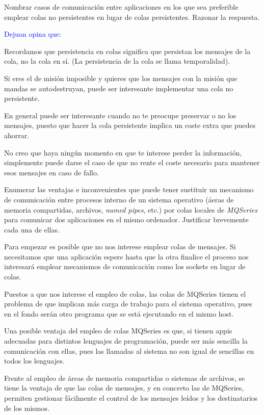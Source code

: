   \begin{problem}[8]
  Nombrar casos de comunicación entre aplicaciones en los que sea
preferible emplear colas no persistentes en lugar de colas persistentes.
Razonar la respuesta.
  \solution

\textcolor{blue}{Dejuan opina que:}

Recordamos que persistencia en colas significa que persistan los mensajes de la cola, no la cola en sí. (La persistencia de la cola se llama temporalidad).

Si eres el de misión imposible y quieres que los mensajes con la misión que mandas se autodestruyan, puede ser interesante implementar una cola no persistente.

\yoP

En general puede ser interesante cuando no te preocupe preservar o no los mensajes, puesto que hacer la cola persistente implica un coste extra que puedes ahorrar.

No creo que haya ningún momento en que te interese perder la información, simplemente puede darse el caso de que no rente el coste necesario para mantener esos mensajes en caso de fallo.


  \end{problem}

  \begin{problem}[9]
  Enumerar las ventajas e inconvenientes que puede tener sustituir un mecanismo
  de comunicación entre procesos interno de un sistema operativo (áeras
  de memoria compartidas, archivos, \textit{named pipes}, etc.) por colas locales
de \textit{MQSeries} para comunicar dos aplicaciones en el mismo ordenador.
Justificar brevemente cada una de ellas.
  \solution

  \yoP

  Para empezar es posible que no nos interese emplear colas de mensajes. Si necesitamos que una aplicación espere hasta que la otra finalice el proceso nos interesará emplear mecanismos de comunicación como los sockets en lugar de colas.

  Puestos a que nos interese el empleo de colas, las colas de MQSeries tienen el problema de que implican más carga de trabajo para el sistema operativo, pues en el fondo serán otro programa que se está ejecutando en el mismo host.

  Una posible ventaja del empleo de colas MQSeries es que, si tienen appis adecuadas para distintos lenguajes de programación, puede ser más sencilla la comunicación con ellas, pues las llamadas al sistema no son igual de sencillas en todos los lenguajes.

  Frente al empleo de áreas de memoria compartidas o sistemas de archivos, se tiene la ventaja de que las colas de mensajes, y en concreto las de MQSeries, permiten gestionar fácilmente el control de los mensajes leídos y los destinatarios de los mismos.


  \end{problem}

